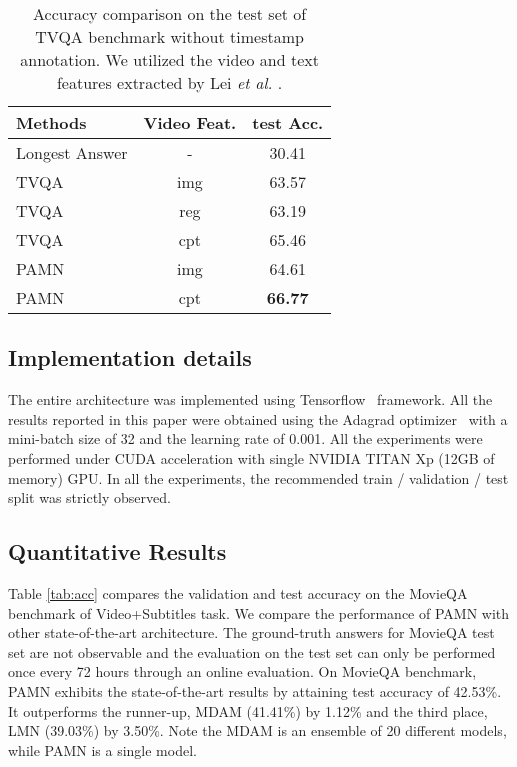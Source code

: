 \documentclass[10pt,twocolumn,letterpaper]{article}
\begin{document}
\begin{table}[t]
	\begin{center}
		\begin{tabular}{l||c|c}
			\hline
			Methods                        & Video Feat. & test Acc.      \\ 
			\hline \hline
			Longest Answer                 & -           & 30.41          \\ 
			\hline
			TVQA \cite{lei2018tvqa}        & img         & 63.57          \\
			TVQA \cite{lei2018tvqa}        & reg         & 63.19          \\
			TVQA \cite{lei2018tvqa}        & cpt         & 65.46          \\
			\hline
			PAMN                           & img         & 64.61          \\
			PAMN                           & cpt         & \textbf{66.77} \\
			\hline
		\end{tabular}
	\end{center}
	\caption{Accuracy comparison on the test set of TVQA benchmark without timestamp annotation. We utilized the video and text features extracted by Lei \textit{et al.} \cite{lei2018tvqa}.}
	\label{tab:acc_tvqa}
\end{table}
\subsection{Implementation details}
\label{ssec:4.3}

The entire architecture was implemented using Tensorflow~\cite{abadi2016tensorflow} framework. All the results reported in this paper were obtained using the Adagrad optimizer~\cite{duchi2011adaptive} with a mini-batch size of 32 and the learning rate of 0.001. All the experiments were performed under CUDA acceleration with single NVIDIA TITAN Xp (12GB of memory) GPU. In all the experiments, the recommended train / validation / test split was strictly observed. 	


\subsection{Quantitative Results}
\label{ssec:4.4}

Table \ref{tab:acc} compares the validation and test accuracy on the MovieQA benchmark of Video+Subtitles task. We compare the performance of PAMN with other state-of-the-art architecture. The ground-truth answers for MovieQA test set are not observable and the evaluation on the test set can only be performed once every 72 hours through an online evaluation. On MovieQA benchmark, PAMN exhibits the state-of-the-art results by attaining test accuracy of 42.53\%. It outperforms the runner-up, MDAM \cite{mdam} (41.41\%) by 1.12\% and the third place, LMN \cite{lmn} (39.03\%) by 3.50\%. Note the MDAM is an ensemble of 20 different models, while PAMN is a single model. 
\end{document}
